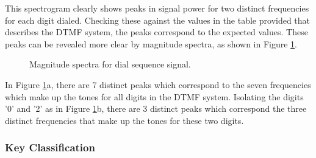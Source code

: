\noindent
This spectrogram clearly shows peaks in signal power for two distinct frequencies for each digit dialed. Checking these against the values in the table provided that describes the DTMF system, the peaks correspond to the expected values. These peaks can be revealed more clear by magnitude spectra, as shown in Figure \ref{fig:magspec}.

\begin{figure}[H]
    \centering
    \caption{Magnitude spectra for dial sequence signal.}
    \label{fig:magspec}
\end{figure}

\noindent
In Figure \ref{fig:magspec}a, there are 7 distinct peaks which correspond to the seven frequencies which make up the tones for all digits in the DTMF system. Isolating the digits '0' and '2' as in Figure \ref{fig:magspec}b, there are 3 distinct peaks which correspond the three distinct frequencies that make up the tones for these two digits.

\subsubsection{Key Classification}


